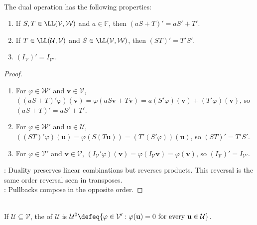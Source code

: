 \begin{theorem} \label{thm:algebra-of-dual-maps} \\
The dual operation has the following properties:
\begin{enumerate}[label=(\roman*)]
\setlength{\itemsep}{0pt}
\item If $S,T\in\LL(\mathcal{V},\mathcal{W})$ and $a\in\mathbb{F}$, then $(aS+T)'=aS'+T'$.
\item If $T\in\LL(\mathcal{U},\mathcal{V})$ and $S\in\LL(\mathcal{V},\mathcal{W})$, then $(ST)'=T'S'$.
\item $(I_{\mathcal{V}})'=I_{\mathcal{V}'}$.
\end{enumerate}
\begin{proof}
\begin{enumerate}[label=(\roman*)]
\setlength{\itemsep}{0pt}
\item For $\varphi\in\mathcal{W}'$ and $\mathbf{v}\in\mathcal{V}$, $\left((aS+T)'\varphi\right)(\mathbf{v}) =\varphi(aS\mathbf{v}+T\mathbf{v}) =a(S'\varphi)(\mathbf{v})+(T'\varphi)(\mathbf{v})$, so $(aS+T)'=aS'+T'$.
\item For $\varphi\in\mathcal{W}'$ and $\mathbf{u}\in\mathcal{U}$, $\left((ST)'\varphi\right)(\mathbf{u}) =\varphi(S(T\mathbf{u})) =\left(T'(S'\varphi)\right)(\mathbf{u})$, so $(ST)'=T'S'$.
\item For $\varphi\in\mathcal{V}'$ and $\mathbf{v}\in\mathcal{V}$, $(I_{\mathcal{V}}'\varphi)(\mathbf{v})=\varphi(I_{\mathcal{V}}\mathbf{v})=\varphi(\mathbf{v})$, so $(I_{\mathcal{V}})'=I_{\mathcal{V}'}$.
\end{enumerate}
: Duality preserves linear combinations but reverses products. This reversal is the same order reversal seen in transposes.\\
: Pullbacks compose in the opposite order.
\end{proof}
\end{theorem}

\begin{definition} \\
If $\mathcal{U}\subseteq\mathcal{V}$, the  of $\mathcal{U}$ is $\mathcal{U}^0\defeq\{\varphi\in\mathcal{V}':\varphi(\mathbf{u})=0 \text{ for every } \mathbf{u}\in\mathcal{U}\}$.
\end{definition}

